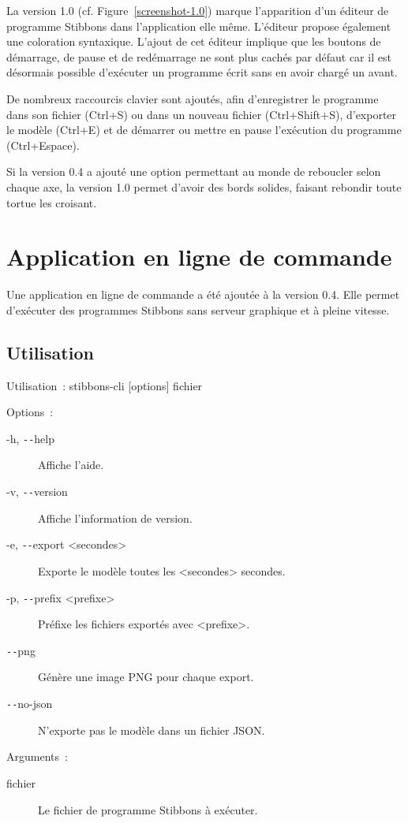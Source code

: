 La version 1.0 (cf. Figure~\ref{screenshot-1.0}) marque l'apparition d'un éditeur de programme Stibbons dans l'application elle même. L'éditeur propose également une coloration syntaxique. L'ajout de cet éditeur implique que les boutons de démarrage, de pause et de redémarrage ne sont plus cachés par défaut car il est désormais possible d'exécuter un programme écrit sans en avoir chargé un avant.

De nombreux raccourcis clavier sont ajoutés, afin d'enregistrer le programme dans son fichier (Ctrl+S) ou dans un nouveau fichier (Ctrl+Shift+S), d'exporter le modèle (Ctrl+E) et de démarrer ou mettre en pause l'exécution du programme (Ctrl+Espace).

Si la version 0.4 a ajouté une option permettant au monde de reboucler selon chaque axe, la version 1.0 permet d'avoir des bords solides, faisant rebondir toute tortue les croisant.

\section{Application en ligne de commande}

Une application en ligne de commande a été ajoutée à la version 0.4. Elle permet d'exécuter des programmes Stibbons sans serveur graphique et à pleine vitesse.

\subsection{Utilisation}

Utilisation~: stibbons-cli [options] fichier

Options~:
\begin{description}
	\item[-h, \texttt{-{}-}help] Affiche l'aide.
	\item[-v, \texttt{-{}-}version] Affiche l'information de version.
	\item[-e, \texttt{-{}-}export <secondes>] Exporte le modèle toutes les <secondes> secondes.
	\item[-p, \texttt{-{}-}prefix <prefixe>] Préfixe les fichiers exportés avec <prefixe>.
	\item[\texttt{-{}-}png] Génère une image PNG pour chaque export.
	\item[\texttt{-{}-}no-json] N'exporte pas le modèle dans un fichier JSON.
\end{description}

Arguments~:
\begin{description}
	\item[fichier] Le fichier de programme Stibbons à exécuter.
\end{description}

